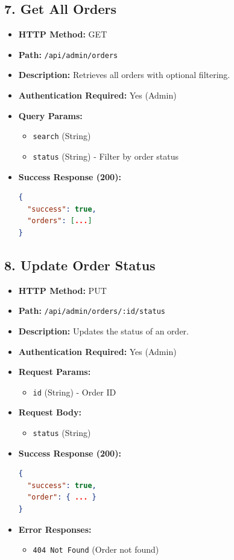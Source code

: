 \documentclass[12pt,a4paper]{article}
\begin{document}
\subsection{7. Get All Orders}
\begin{itemize}
    \item \textbf{HTTP Method:} GET
    \item \textbf{Path:} \texttt{/api/admin/orders}
    \item \textbf{Description:} Retrieves all orders with optional filtering.
    \item \textbf{Authentication Required:} Yes (Admin)
    \item \textbf{Query Params:}
    \begin{itemize}
        \item \texttt{search} (String)
        \item \texttt{status} (String) - Filter by order status
    \end{itemize}
    \item \textbf{Success Response (200):}
\begin{lstlisting}[language=json]
{
  "success": true,
  "orders": [...]
}
\end{lstlisting}
\end{itemize}

\subsection{8. Update Order Status}
\begin{itemize}
    \item \textbf{HTTP Method:} PUT
    \item \textbf{Path:} \texttt{/api/admin/orders/:id/status}
    \item \textbf{Description:} Updates the status of an order.
    \item \textbf{Authentication Required:} Yes (Admin)
    \item \textbf{Request Params:}
    \begin{itemize}
        \item \texttt{id} (String) - Order ID
    \end{itemize}
    \item \textbf{Request Body:}
    \begin{itemize}
        \item \texttt{status} (String)
    \end{itemize}
    \item \textbf{Success Response (200):}
\begin{lstlisting}[language=json]
{
  "success": true,
  "order": { ... }
}
\end{lstlisting}
    \item \textbf{Error Responses:}
    \begin{itemize}
        \item \texttt{404 Not Found} (Order not found)
    \end{itemize}
\end{itemize}
\end{document}
